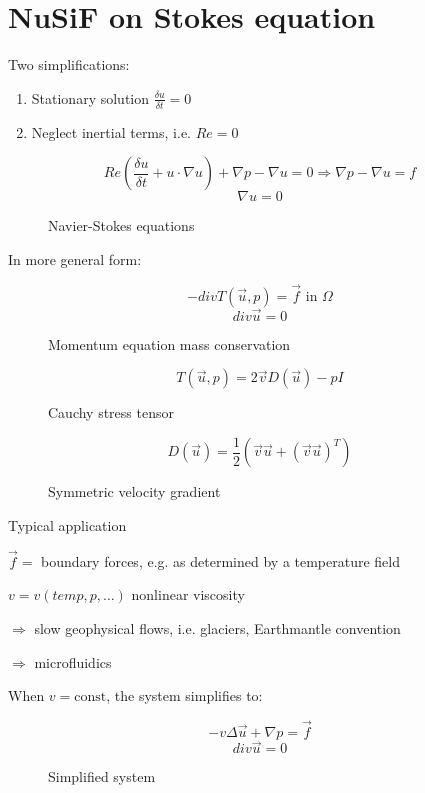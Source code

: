 \section*{NuSiF on Stokes equation}
Two simplifications:
\begin{enumerate}
	\item Stationary solution $\frac{\delta u}{\delta t} = 0$
	\item Neglect inertial terms, i.e. $Re = 0$
\end{enumerate}

\begin{figure}[H]
	\centering
	\[ Re( \frac{\delta u}{\delta t} + u \cdot \nabla u) + \nabla p - \nabla u = 0 \Rightarrow \nabla p - \nabla u = f\]
	\[ \nabla u = 0 \]
	\renewcommand{\thefigure}{S0}
	\caption{Navier-Stokes equations}
	\label{fig:stokes-ns}
\end{figure}
 In more general form:
 \begin{figure}[H]
	\centering
	\[ - div T(\vec{u},p) = \vec{f} \text{ in } \Omega \]
	\[ div \vec{u} = 0 \]
	\renewcommand{\thefigure}{S1}
	\caption{Momentum equation mass conservation}
	\label{fig:stokes-mass}
\end{figure}
\begin{figure}[H]
	\centering
	\[ T(\vec{u},p) = 2 \vec{v} D(\vec{u}) - pI \]
	\renewcommand{\thefigure}{S2}
	\caption{Cauchy stress tensor}
	\label{fig:cauchy}
\end{figure}
\begin{figure}[H]
	\centering
	\[ D(\vec{u}) = \frac{1}{2} (\vec{v}\vec{u}+ (\vec{v}\vec{u})^T) \]
	\renewcommand{\thefigure}{S3}
	\caption{Symmetric velocity gradient}
	\label{fig:symm-vel-grad}
\end{figure}

Typical application

$\vec{f} = $ boundary forces, e.g. as determined by a temperature field

$v = v(temp, p, \dots) $ nonlinear viscosity

$\Rightarrow$ slow geophysical flows, i.e. glaciers, Earthmantle convention

$\Rightarrow$ microfluidics

When $v = \text{const}$, the system simplifies to:

\begin{figure}[H]
	\centering
	\[ -v \Delta \vec{u} +  \nabla p = \vec{f}\]
	\[ div \vec{u} = 0\]  %
	\renewcommand{\thefigure}{S4}
	\caption{Simplified system}
	\label{fig:disc-freesplipb}
\end{figure}

